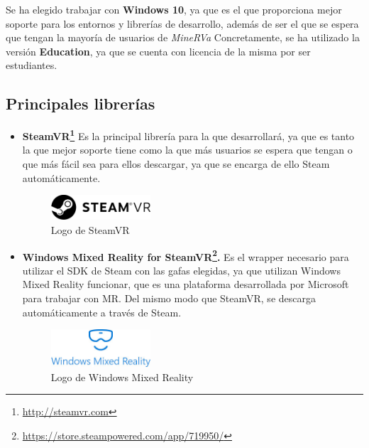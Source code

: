 Se ha elegido trabajar con \textbf{Windows 10}, ya que es el que proporciona mejor soporte para los entornos y librerías de desarrollo, además de ser el que se espera que tengan la mayoría de usuarios de \textit{MineRVa} Concretamente, se ha utilizado la versión \textbf{Education}, ya que se cuenta con licencia de la misma por ser estudiantes.

\subsection{Principales librerías}

\begin{itemize}
    \item \textbf{SteamVR\footnote{\url{http://steamvr.com}}} Es la principal librería para la que desarrollará, ya que es tanto la que mejor soporte tiene como la que más usuarios se espera que tengan o que más fácil sea para ellos descargar, ya que se encarga de ello Steam automáticamente.
    
\begin{figure}[!h]
\begin{center}
\includegraphics[width=0.35\textwidth]{imagenes/4/steamvr-logo.jpg}
\caption{Logo de SteamVR}
\label{fig:steamvr-logo}
\end{center}
\end{figure}

    \item \textbf{Windows Mixed Reality for SteamVR\footnote{\url{https://store.steampowered.com/app/719950/}}.} Es el wrapper necesario para utilizar el SDK de Steam con las gafas elegidas, ya que utilizan Windows Mixed Reality funcionar, que es una plataforma desarrollada por Microsoft para trabajar con \acs{MR}. Del mismo modo que SteamVR, se descarga automáticamente a través de Steam.

\begin{figure}[!h]
\begin{center}
\includegraphics[width=0.35\textwidth]{imagenes/4/wmr-logo.jpg}
\caption{Logo de Windows Mixed Reality}
\label{fig:wmr-logo}
\end{center}
\end{figure}


\end{itemize}
